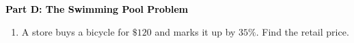 \documentclass[12pt, letterpaper, fleqn]{article}
\newcommand{\blank}{\underline{\hspace{2.2cm}}}
\begin{document}
\newpage

\begin{tcolorbox}[colback=customteal!20]
\large\textcolor{black}{\textbf{Part D: The Swimming Pool Problem}}
\end{tcolorbox}

\vspace{3mm}

\begin{enumerate}[itemsep=4.2cm, leftmargin=0.6cm, resume]
\item A store buys a bicycle for $\$120$ and marks it up by $35\%$. Find the retail price. \blank
\end{enumerate}
\end{document}
